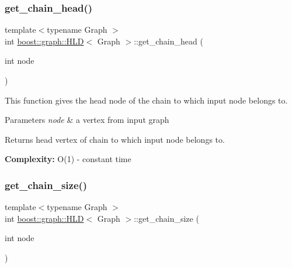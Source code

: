 \subsubsection{\texorpdfstring{get\+\_\+chain\+\_\+head()}{get\_chain\_head()}}
{\footnotesize\ttfamily template$<$typename Graph $>$ \\
int \hyperlink{classboost_1_1graph_1_1HLD}{boost\+::graph\+::\+H\+LD}$<$ Graph $>$\+::get\+\_\+chain\+\_\+head (\begin{DoxyParamCaption}\item[{int}]{node }\end{DoxyParamCaption})\hspace{0.3cm}{\ttfamily [inline]}}


\begin{DoxyItemize}
\item This function gives the head node of the chain to which input node belongs to.  
\end{DoxyItemize}
\begin{DoxyParams}{Parameters}
{\em node} & a vertex from input graph \\
\hline
\end{DoxyParams}
\begin{DoxyReturn}{Returns}
head vertex of chain to which input node belongs to. 
\end{DoxyReturn}


{\bfseries  Complexity\+: } O(1) -\/ constant time \mbox{\label{classboost_1_1graph_1_1HLD_a3074f4291c264d79247f9d65f03923b1}} 
\subsubsection{\texorpdfstring{get\+\_\+chain\+\_\+size()}{get\_chain\_size()}}
{\footnotesize\ttfamily template$<$typename Graph $>$ \\
int \hyperlink{classboost_1_1graph_1_1HLD}{boost\+::graph\+::\+H\+LD}$<$ Graph $>$\+::get\+\_\+chain\+\_\+size (\begin{DoxyParamCaption}\item[{int}]{node }\end{DoxyParamCaption})\hspace{0.3cm}{\ttfamily [inline]}}



